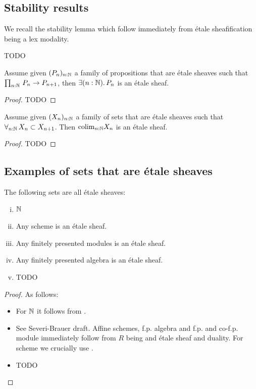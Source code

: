 \subsection{Stability results}

We recall the stability lemma which follow immediately from étale sheafification being a lex modality.

\begin{proposition}
TODO
\end{proposition}

\begin{lemma}\label{etale-proposition-union}
Assume given $(P_n)_{n:\mathbb{N}}$ a family of propositions that are étale sheaves such that $\prod_{n:\mathbb{N}}\, P_n\to P_{n+1}$, then $\exists(n:\mathbb{N}).\, P_n$ is an étale sheaf.
\end{lemma}

\begin{proof}
TODO
\end{proof}

\begin{lemma}\label{etale-set-union}
Assume given $(X_n)_{n:\mathbb{N}}$ a family of sets that are étale sheaves such that $\forall_{n:\mathbb{N}}\, X_n\subset X_{n+1}$. Then $\mathrm{colim}_{n:\mathbb{N}}X_n$ is an étale sheaf.
\end{lemma}

\begin{proof}
TODO
\end{proof}



\subsection{Examples of sets that are \'etale sheaves}

\begin{proposition}
The following sets are all \'etale sheaves: 
\begin{enumerate}[(i)]
\item $\mathbb{N}$
\item Any scheme is an \'etale sheaf.
\item Any finitely presented modules is an \'etale sheaf.
\item Any finitely presented algebra is an \'etale sheaf.
\item TODO
\end{enumerate}
\end{proposition}

\begin{proof}
As follows:
\begin{itemize}
\item[(i)] For $\mathbb{N}$ it follows from . 
\item[(ii,iii,iv)] See Severi-Brauer draft. Affine schemes, f.p. algebra and f.p. and co-f.p. module immediately follow from $R$ being and \'etale sheaf and duality. For scheme we crucially use . 
\item TODO
\end{itemize}
\end{proof}


